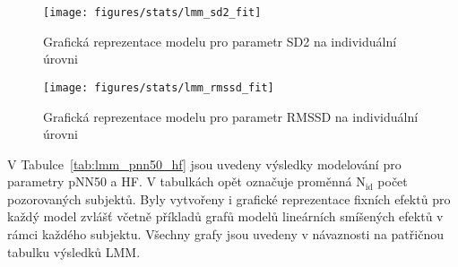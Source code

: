 \begin{figure}[!htb]
    \begin{center}
        \texttt{[image: figures/stats/lmm\_sd2\_fit]}
        \caption{Grafická reprezentace modelu pro parametr SD2 na individuální úrovni}
        \label{fig:results_lmm_fit1}
    \end{center}
    \vspace{-10mm}
\end{figure}

\begin{figure}[!htb]
    \begin{center}
        \texttt{[image: figures/stats/lmm\_rmssd\_fit]}
        \caption{Grafická reprezentace modelu pro parametr RMSSD na individuální úrovni}
        \label{fig:results_lmm_fit2}
    \end{center}
\end{figure}

V Tabulce~\ref{tab:lmm_pnn50_hf} jsou uvedeny výsledky modelování pro parametry
pNN50 a HF. V tabulkách opět označuje proměnná $\mathrm{N}_{\text{id}}$ počet
pozorovaných subjektů. Byly vytvořeny i grafické reprezentace fixních efektů pro
každý model zvlášť včetně příkladů grafů modelů lineárních smíšených efektů v
rámci každého subjektu. Všechny grafy jsou uvedeny v návaznosti na patřičnou
tabulku výsledků \gls{LMM}. 

